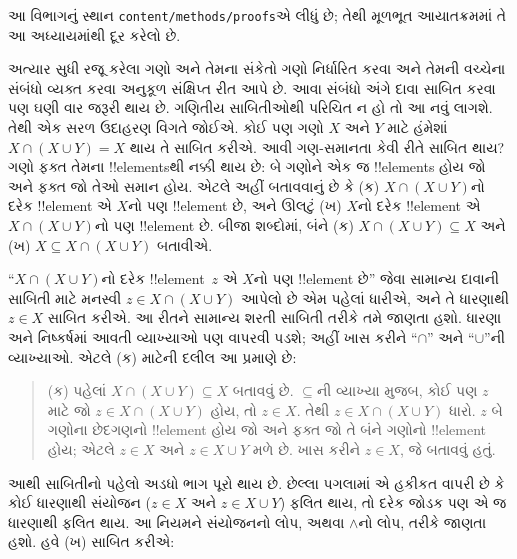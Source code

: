 \documentclass[../../../include/open-logic-section]{subfiles}
\begin{document}

\begin{editorial}
આ વિભાગનું સ્થાન \verb|content/methods/proofs|એ લીધું છે;
તેથી મૂળભૂત આયાતક્રમમાં તે આ અધ્યાયમાંથી દૂર કરેલો છે.
\end{editorial}

\begin{explain}
અત્યાર સુધી રજૂ કરેલા ગણો અને તેમના સંકેતો ગણો નિર્ધારિત કરવા
અને તેમની વચ્ચેના સંબંધો વ્યક્ત કરવા અનુકૂળ સંક્ષિપ્ત રીત આપે છે.
આવા સંબંધો અંગે દાવા સાબિત કરવા પણ ઘણી વાર જરૂરી થાય છે.
ગણિતીય સાબિતીઓથી પરિચિત ન હો તો આ નવું લાગશે.
તેથી એક સરળ ઉદાહરણ વિગતે જોઈએ.
કોઈ પણ ગણો $X$ અને $Y$ માટે હંમેશાં
$X \cap (X \cup Y) = X$ થાય તે સાબિત કરીએ.
આવી ગણ-સમાનતા કેવી રીતે સાબિત થાય?
ગણો ફક્ત તેમના !!{element}sથી નક્કી થાય છે:
બે ગણોને એક જ !!{element}s હોય જો અને ફક્ત જો તેઓ સમાન હોય.
એટલે અહીં બતાવવાનું છે કે (ક) $X \cap (X \cup
Y)$નો દરેક !!{element} એ $X$નો પણ !!{element} છે,
અને ઊલટું (ખ) $X$નો દરેક !!{element} એ
$X \cap (X \cup Y)$નો પણ !!{element} છે.
બીજા શબ્દોમાં, બંને (ક) $X \cap (X \cup Y) \subseteq X$
અને (ખ) $X \subseteq X \cap (X \cup Y)$ બતાવીએ.

``$X \cap (X \cup Y)$નો દરેક !!{element}~$z$
એ $X$નો પણ !!{element} છે'' જેવા સામાન્ય દાવાની સાબિતી
માટે મનસ્વી $z \in X \cap (X \cup Y)$ આપેલો છે એમ
પહેલાં ધારીએ, અને તે ધારણાથી $z \in X$ સાબિત કરીએ.
આ રીતને સામાન્ય શરતી સાબિતી તરીકે તમે જાણતા હશો.
ધારણા અને નિષ્કર્ષમાં આવતી વ્યાખ્યાઓ પણ વાપરવી પડશે;
અહીં ખાસ કરીને ``$\cap$'' અને ``$\cup$''ની વ્યાખ્યાઓ.
એટલે (ક) માટેની દલીલ આ પ્રમાણે છે:

\begin{quote}
(ક) પહેલાં $X \cap (X \cup Y) \subseteq X$ બતાવવું છે.
$\subseteq$ની વ્યાખ્યા મુજબ, કોઈ પણ $z$ માટે
જો $z \in X \cap (X \cup Y)$ હોય, તો $z \in X$.
તેથી $z \in X \cap (X \cup Y)$ ધારો.
$z$ બે ગણોના છેદગણનો !!{element} હોય જો અને ફક્ત જો
તે બંને ગણોનો !!{element} હોય; એટલે $z \in X$ અને
$z \in X \cup Y$ મળે છે. ખાસ કરીને $z \in X$,
જે બતાવવું હતું.
\end{quote}

આથી સાબિતીનો પહેલો અડધો ભાગ પૂરો થાય છે.
છેલ્લા પગલામાં એ હકીકત વાપરી છે કે કોઈ ધારણાથી
સંયોજન ($z \in X$ અને $z \in X \cup Y$) ફલિત થાય,
તો દરેક જોડક પણ એ જ ધારણાથી ફલિત થાય.
આ નિયમને સંયોજનનો લોપ, અથવા $\land$નો લોપ, તરીકે જાણતા હશો.
હવે (ખ) સાબિત કરીએ:


\end{explain}
\end{document}
